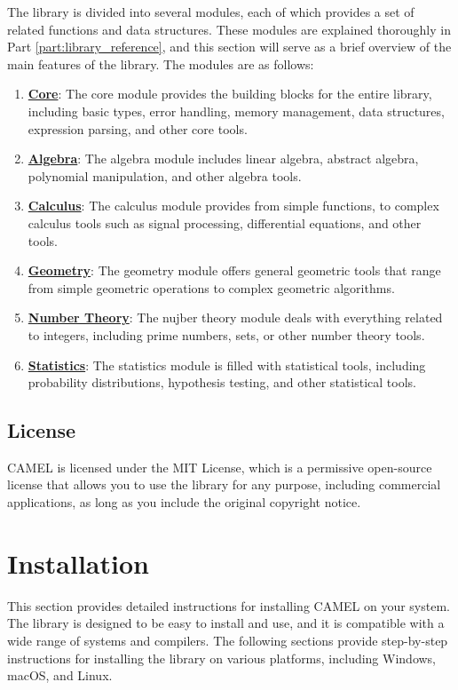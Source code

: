 \documentclass[a4paper,oneside,10pt]{article}
\theoremstyle{definition}
\begin{document}
The library is divided into several modules, each of which provides a set of related functions and data structures. These modules are explained thoroughly in Part \ref{part:library_reference}, and this section will serve as a brief overview of the main features of the library. The modules are as follows:
\begin{enumerate}
  \item \textbf{\hyperref[sec:core]{Core}}: The core module provides the building blocks for the entire library, including basic types, error handling, memory management, data structures, expression parsing, and other core tools.
  \item \textbf{\hyperref[sec:algebra]{Algebra}}: The algebra module includes linear algebra, abstract algebra, polynomial manipulation, and other algebra tools.
  \item \textbf{\hyperref[sec:calculus]{Calculus}}: The calculus module provides from simple functions, to complex calculus tools such as signal processing, differential equations, and other tools.
  \item \textbf{\hyperref[sec:geometry]{Geometry}}: The geometry module offers general geometric tools that range from simple geometric operations to complex geometric algorithms.
  \item \textbf{\hyperref[sec:number_theory]{Number Theory}}: The nujber theory module deals with everything related to integers, including prime numbers, sets, or other number theory tools.
  \item \textbf{\hyperref[sec:statistics]{Statistics}}: The statistics module is filled with statistical tools, including probability distributions, hypothesis testing, and other statistical tools.
\end{enumerate}

\subsection{License}

CAMEL is licensed under the MIT License, which is a permissive open-source license that allows you to use the library for any purpose, including commercial applications, as long as you include the original copyright notice.


\section{Installation}

This section provides detailed instructions for installing CAMEL on your system. The library is designed to be easy to install and use, and it is compatible with a wide range of systems and compilers. The following sections provide step-by-step instructions for installing the library on various platforms, including Windows, macOS, and Linux.
\end{document}
